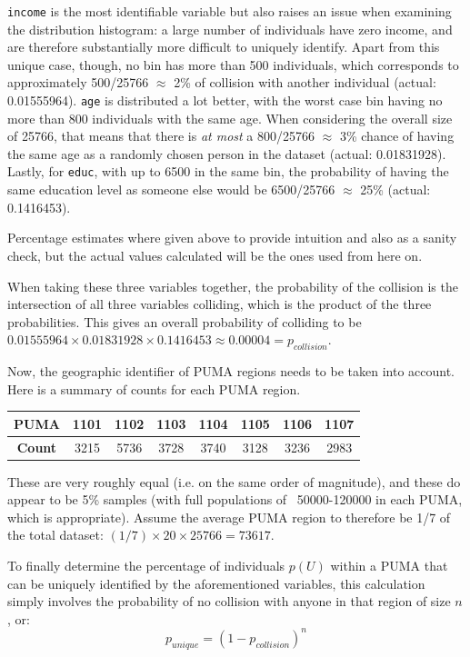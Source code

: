 \documentclass[12pt]{article}
\begin{document}
\texttt{income} is the most identifiable variable but also raises an issue when examining the distribution histogram: a large number of individuals have zero income, and are therefore substantially more difficult to uniquely identify. Apart from this unique case, though, no bin has more than 500 individuals, which corresponds to approximately 500/25766 $\approx$ 2\% of collision with another individual (actual: {0.01555964}). \texttt{age} is distributed a lot better, with the worst case bin having no more than 800 individuals with the same age. When considering the overall size of 25766, that means that there is \emph{at most} a 800/25766 $\approx$ 3\% chance of having the same age as a randomly chosen person in the dataset (actual: {0.01831928}). Lastly, for \texttt{educ}, with up to 6500 in the same bin, the probability of having the same education level as someone else would be 6500/25766 $\approx$ 25\% (actual: {0.1416453}).

Percentage estimates where given above to provide intuition and also as a sanity check, but the actual values calculated will be the ones used from here on.

When taking these three variables together, the probability of the collision is the intersection of all three variables colliding, which is the product of the three probabilities. This gives an overall probability of colliding to be $0.01555964 \times 0.01831928 \times 0.1416453 \approx {0.00004} = p_{collision}$.

Now, the geographic identifier of PUMA regions needs to be taken into account. Here is a summary of counts for each PUMA region.
\begin{center}
\begin{tabular}{|c|ccccccc|}
\hline
\textbf{PUMA} & 1101 & 1102 & 1103 & 1104 & 1105 & 1106 & 1107\\\hline
\textbf{Count} & 3215 & 5736 & 3728 & 3740 & 3128 & 3236 & 2983\\ \hline
\end{tabular}
\end{center}
These are very roughly equal (i.e. on the same order of magnitude), and these do appear to be 5\% samples (with full populations of ~50000-120000 in each PUMA, which is appropriate). Assume the average PUMA region to therefore be 1/7 of the total dataset: $(1/7) \times 20 \times 25766 = 73617$.

To finally determine the percentage of individuals $p(U)$ within a PUMA that can be uniquely identified by the aforementioned variables, this calculation simply involves the probability of no collision with anyone in that region of size $n$, or:
\[p_{unique} = (1-p_{collision})^{n}\]
\end{document}

